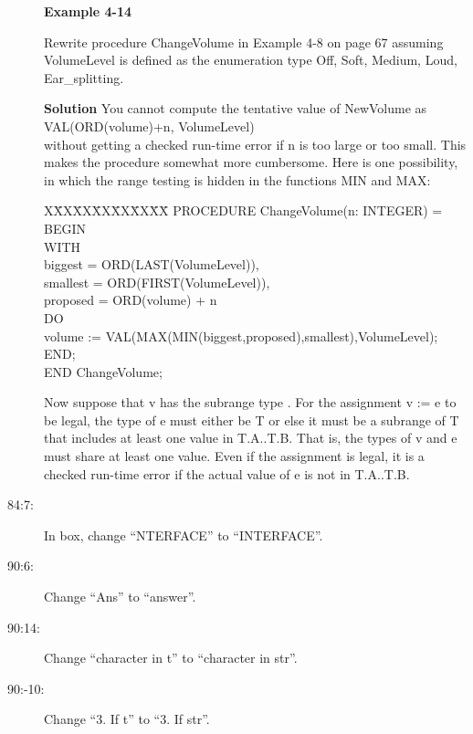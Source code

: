 \begin{description}
\noindent
{\bf Example 4-14}

\noindent
Rewrite procedure {\sf ChangeVolume} in Example 4-8 on page 67 assuming
{\sf VolumeLevel} is defined as the enumeration type {\sf Off, Soft, Medium,
Loud, Ear\_splitting}.

\noindent
{\bf Solution}  You cannot compute the tentative value of {\sf NewVolume} as\\
{\sf VAL(ORD(volume)+n, VolumeLevel)}\\
without getting a checked run-time
error if {\sf n} is too large or too small. This makes the procedure
somewhat more cumbersome. Here is one possibility, in which the
range testing is hidden in the functions {\sf MIN} and {\sf MAX}:
{\sf
\begin{tabbing}
X\=XX\=XX\=XX\=XX\=XX\=XX\= \kill
\> PROCEDURE ChangeVolume(n: INTEGER) =\\
\> \> BEGIN\\
\> \> \> WITH\\ 
\> \> \> \> biggest  = ORD(LAST(VolumeLevel)),\\
\> \> \> \> smallest = ORD(FIRST(VolumeLevel)),\\
\> \> \> \> proposed = ORD(volume) + n\\
\> \> \> DO\\
\> \> \> \> volume := VAL(MAX(MIN(biggest,proposed),smallest),VolumeLevel);\\
\> \> \> END;\\
\> \> END ChangeVolume;
\end{tabbing}
}

\noindent
Now suppose that {\sf v} has the subrange type {\sf [T.A..T.B]}. For 
the assignment {\sf v := e} to be legal, the type of {\sf e} must either
be {\sf T} or else it must be a subrange of {\sf T} that includes at least
one value in {\sf T.A..T.B}. That is, the types of {\sf v} and {\sf e}
must share at least one value. Even if the assignment is legal, it is a 
checked run-time error if the actual value of {\sf e} is not in {\sf T.A..T.B}.

\item[84:7:] In box, change ``{\sf NTERFACE}'' to ``{\sf INTERFACE}''.

\item[90:6:] Change ``{\sf Ans}'' to ``{\sf answer}''.

\item[90:14:] Change ``character in {\sf t}'' to ``character in {\sf str}''.

\item[90:-10:] Change ``3.  If {\sf t}'' to ``3.  If {\sf str}''.


\end{description}
